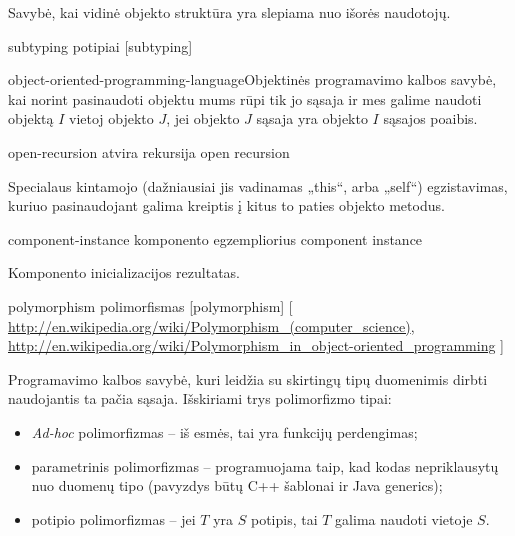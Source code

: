 \begin{glossary}
\begin{entry}
    Savybė, kai vidinė objekto struktūra yra slepiama nuo išorės
    naudotojų. \cite[225]{types-and-programming-languages}
    
  \end{entry}

  \begin{entry}%
    {subtyping}%
    {potipiai}%
    [subtyping]

    \gls{object-oriented-programming-language}{Objektinės programavimo
    kalbos} savybė, kai norint pasinaudoti objektu mums rūpi tik
    jo sąsaja ir mes galime naudoti objektą $I$ vietoj
    objekto $J$, jei objekto $J$ sąsaja yra objekto $I$ sąsajos poaibis.
    \cite[226]{types-and-programming-languages}
    
  \end{entry}

  \begin{entry}%
    {open-recursion}%
    {atvira rekursija}%
    {open recursion}

    Specialaus kintamojo (dažniausiai jis vadinamas „this“, arba
    „self“) egzistavimas, kuriuo pasinaudojant galima kreiptis į
    kitus to paties objekto metodus.
    \cite[226]{types-and-programming-languages}
    
  \end{entry}

  \begin{entry}%
    {component-instance}%
    {komponento egzempliorius}%
    {component instance}

    Komponento inicializacijos rezultatas.
    
  \end{entry}


  \begin{entry}%
    {polymorphism}%
    {polimorfismas}%
    [polymorphism]%
    [%
    \url{http://en.wikipedia.org/wiki/Polymorphism_(computer_science)}, %
    \url{http://en.wikipedia.org/wiki/Polymorphism_in_object-oriented_programming}%
    ]%

    Programavimo kalbos savybė, kuri leidžia su skirtingų tipų duomenimis
    dirbti naudojantis ta pačia sąsaja. Išskiriami trys polimorfizmo tipai:
    \begin{itemize}
      \item \emph{Ad-hoc} polimorfizmas  –
        iš esmės, tai yra funkcijų perdengimas;
      \item parametrinis polimorfizmas  –
        programuojama taip, kad kodas nepriklausytų nuo duomenų tipo
        (pavyzdys būtų C++ šablonai ir Java generics);
      \item potipio polimorfizmas  – 
        jei $T$ yra $S$ potipis, tai $T$ galima naudoti vietoje $S$.
    \end{itemize}
    
  \end{entry}
\end{glossary}


